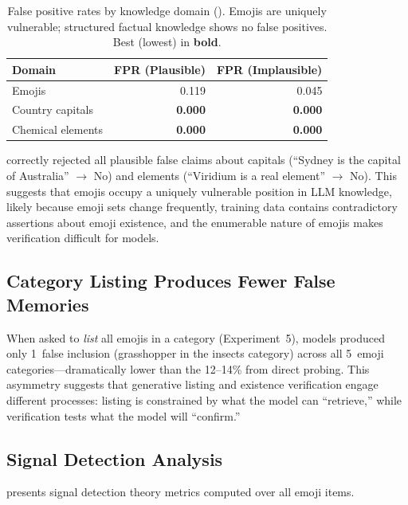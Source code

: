 \begin{table}[t]
    \centering
    \caption{False positive rates by knowledge domain (\gptfull). Emojis are uniquely vulnerable; structured factual knowledge shows no false positives. Best (lowest) \fpr in \textbf{bold}.}
    \begin{tabular}{@{}lrr@{}}
        \toprule
        \textbf{Domain} & \textbf{FPR (Plausible)} & \textbf{FPR (Implausible)} \\
        \midrule
        Emojis            & 0.119 & 0.045 \\
        Country capitals  & \textbf{0.000} & \textbf{0.000} \\
        Chemical elements & \textbf{0.000} & \textbf{0.000} \\
        \bottomrule
    \end{tabular}
    \label{tab:domain}
\end{table}

\gptfull correctly rejected all plausible false claims about capitals (\eg ``Sydney is the capital of Australia'' $\rightarrow$ No) and elements (\eg ``Viridium is a real element'' $\rightarrow$ No).
This suggests that emojis occupy a uniquely vulnerable position in LLM knowledge, likely because emoji sets change frequently, training data contains contradictory assertions about emoji existence, and the enumerable nature of emojis makes verification difficult for models.

\subsection{Category Listing Produces Fewer False Memories}

When asked to \emph{list} all emojis in a category (Experiment~5), models produced only 1~false inclusion (grasshopper in the insects category) across all 5~emoji categories---dramatically lower than the 12--14\% \fpr from direct probing.
This asymmetry suggests that generative listing and existence verification engage different processes: listing is constrained by what the model can ``retrieve,'' while verification tests what the model will ``confirm.''

\subsection{Signal Detection Analysis}

 presents signal detection theory metrics computed over all emoji items.

